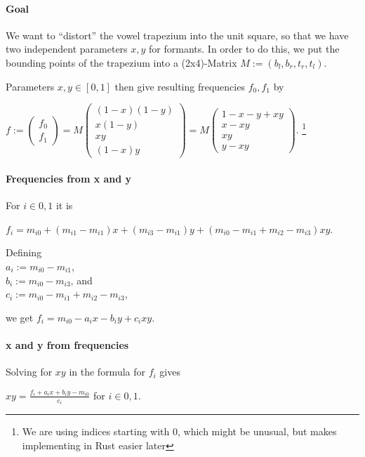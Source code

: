 \documentclass[a4paper]{article}
\newcommand{\m}[2]{\left(\begin{array}{#1} #2 \end{array}\right)}
\begin{document}
\paragraph{Goal}\hspace{1mm}

We want to ``distort'' the vowel trapezium into the unit square, so that we have two independent parameters $x, y$ for formants.
In order to do this, we put the bounding points of the trapezium into a (2x4)-Matrix $M:=(b_l, b_r, t_r, t_l)$.

Parameters $x, y \in[0,1]$ then give resulting frequencies $f_0, f_1$ by

$f:=\m{c}{f_0\\f_1}=M\m{c}{(1-x)(1-y)\\x(1-y)\\xy\\(1-x)y}=M\m{c}{1-x-y+xy\\x-xy\\xy\\y-xy}$.
\footnote{We are using indices starting with $0$, which might be unusual, but makes implementing in Rust easier later}



\paragraph{Frequencies from x and y}\hspace{1mm}

For $i\in{0,1}$ it is

$f_i=m_{i0}+(m_{i1}-m_{i1})x+(m_{i3}-m_{i1})y+(m_{i0}-m_{i1}+m_{i2}-m_{i3})xy$.

Defining
\\ $a_i:=m_{i0}-m_{i1}$,
\\ $b_i:=m_{i0}-m_{i3}$, and
\\ $c_i:=m_{i0}-m_{i1}+m_{i2}-m_{i3}$,

we get $f_i=m_{i0}-a_ix-b_iy+c_ixy$.

\paragraph{x and y from frequencies}\hspace{1mm}

Solving for $xy$ in the formula for $f_i$ gives

$xy=\frac{f_i+a_ix+b_iy-m_{i0}}{c_i}$ for $i\in{0,1}$.
\end{document}
